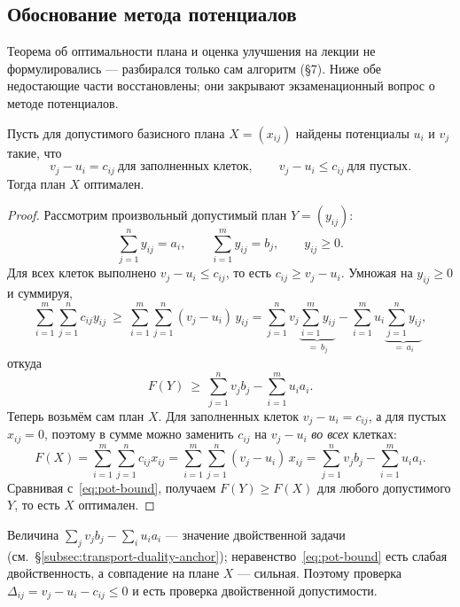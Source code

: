 \subsection{Обоснование метода потенциалов}
\label{subsec:potentials-theory}

\begin{idea}[title={Откуда этот материал}]
Теорема об оптимальности плана и оценка улучшения на лекции не формулировались
— разбирался только сам алгоритм (§7). Ниже обе недостающие части
восстановлены; они закрывают экзаменационный вопрос о методе потенциалов.
\end{idea}

\begin{theorem}\label{thm:potentials-opt}
Пусть для допустимого базисного плана $X = (x_{ij})$ найдены потенциалы
$u_i$ и $v_j$ такие, что
\[
  v_j - u_i = c_{ij} \ \text{для заполненных клеток},
  \qquad
  v_j - u_i \le c_{ij} \ \text{для пустых} .
\]
Тогда план $X$ оптимален.
\end{theorem}

\begin{proof}
Рассмотрим произвольный допустимый план $Y = (y_{ij})$:
\[
  \sum_{j=1}^{n} y_{ij} = a_i , \qquad
  \sum_{i=1}^{m} y_{ij} = b_j , \qquad y_{ij} \ge 0 .
\]
Для всех клеток выполнено $v_j - u_i \le c_{ij}$, то есть
$c_{ij} \ge v_j - u_i$. Умножая на $y_{ij} \ge 0$ и суммируя,
\[
  \sum_{i=1}^{m}\sum_{j=1}^{n} c_{ij} y_{ij}
  \ \ge\ \sum_{i=1}^{m}\sum_{j=1}^{n} (v_j - u_i)\, y_{ij}
  = \sum_{j=1}^{n} v_j \underbrace{\sum_{i=1}^{m} y_{ij}}_{=\ b_j}
    - \sum_{i=1}^{m} u_i \underbrace{\sum_{j=1}^{n} y_{ij}}_{=\ a_i} ,
\]
откуда
\begin{equation}\label{eq:pot-bound}
  F(Y) \ \ge\ \sum_{j=1}^{n} v_j b_j - \sum_{i=1}^{m} u_i a_i .
\end{equation}
Теперь возьмём сам план $X$. Для заполненных клеток $v_j - u_i = c_{ij}$, а для
пустых $x_{ij} = 0$, поэтому в сумме можно заменить $c_{ij}$ на $v_j - u_i$
\emph{во всех} клетках:
\[
  F(X) = \sum_{i=1}^{m}\sum_{j=1}^{n} c_{ij} x_{ij}
       = \sum_{i=1}^{m}\sum_{j=1}^{n} (v_j - u_i)\, x_{ij}
       = \sum_{j=1}^{n} v_j b_j - \sum_{i=1}^{m} u_i a_i .
\]
Сравнивая с~\eqref{eq:pot-bound}, получаем $F(Y) \ge F(X)$ для любого
допустимого $Y$, то есть $X$ оптимален.
\end{proof}

\begin{idea}
Величина $\sum_j v_j b_j - \sum_i u_i a_i$ — значение двойственной задачи
(см.~\S\ref{subsec:transport-duality-anchor}); неравенство~\eqref{eq:pot-bound}
есть слабая двойственность, а совпадение на плане $X$ — сильная. Поэтому
проверка $\Delta_{ij} = v_j - u_i - c_{ij} \le 0$ и есть проверка двойственной
допустимости.
\end{idea}

